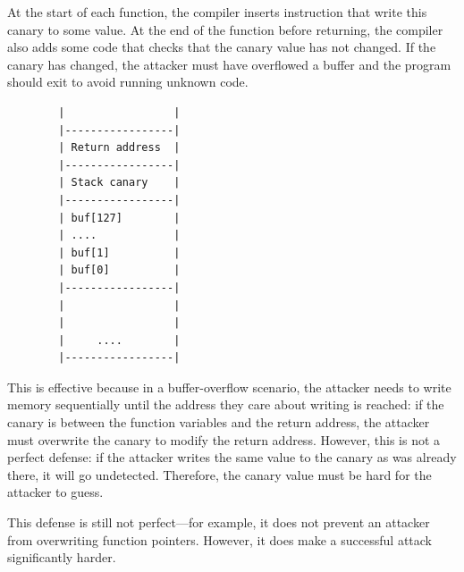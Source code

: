 \documentclass[
  letterpaper,
]{scrbook}
\theoremstyle{definition}
\theoremstyle{plain}
\theoremstyle{plain}
\theoremstyle{remark}
\begin{document}


At the start of each function, the compiler inserts instruction that
write this canary to some value. At the end of the function before
returning, the compiler also adds some code that checks that the canary
value has not changed. If the canary has changed, the attacker must have
overflowed a buffer and the program should exit to avoid running unknown
code.

\begin{verbatim}
        |                 |
        |-----------------|
        | Return address  |
        |-----------------|
        | Stack canary    |
        |-----------------|
        | buf[127]        |
        | ....            |
        | buf[1]          |
        | buf[0]          |
        |-----------------|
        |                 |
        |                 |
        |     ....        |
        |-----------------|
\end{verbatim}

This is effective because in a buffer-overflow scenario, the attacker
needs to write memory sequentially until the address they care about
writing is reached: if the canary is between the function variables and
the return address, the attacker must overwrite the canary to modify the
return address. However, this is not a perfect defense: if the attacker
writes the same value to the canary as was already there, it will go
undetected. Therefore, the canary value must be hard for the attacker to
guess.

This defense is still not perfect---for example, it does not prevent an
attacker from overwriting function pointers. However, it does make a
successful attack significantly harder.
\end{document}
